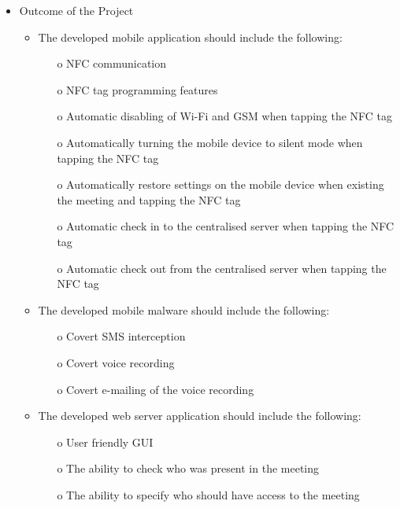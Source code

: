 \begin{itemize}
	\item Outcome of the Project
	\begin{itemize}
		\item The developed mobile application should include the following:
		\begin{itemize}
			\item[o] NFC communication
			\item[o] NFC tag programming features
			\item[o] Automatic disabling of Wi-Fi and GSM when tapping the NFC tag
			\item[o] Automatically turning the mobile device to silent mode when tapping the NFC tag
			\item[o] Automatically restore settings on the mobile device when existing the meeting and tapping the NFC tag
			\item[o] Automatic check in to the centralised server when tapping the NFC tag
			\item[o] Automatic check out from the centralised server when tapping the NFC tag
		\end{itemize}
		\item The developed mobile malware should include the following:
		\begin{itemize}
			\item [o] Covert SMS interception
			\item [o] Covert voice recording
			\item [o] Covert e-mailing of the voice recording
		\end{itemize}
		\item The developed web server application should include the following:
		\begin{itemize}
			\item [o] User friendly GUI
			\item [o] The ability to check who was present in the meeting
			\item [o] The ability to specify who should have access to the meeting
		\end{itemize}
	\end{itemize}
	
\end{itemize}

